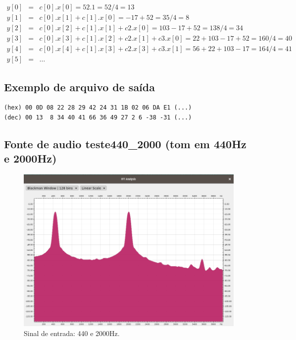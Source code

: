 \documentclass{article}
\begin{document}
\begin{eqnarray}
	y[0] &=& c[0] . x[0] = 52 . 1 = 52/4 = 13 \nonumber \\
	y[1] &=& c[0] . x[1] + c[1] . x[0] = -17 + 52 = 35 / 4 = 8 \nonumber \\
	y[2] &=& c[0] . x[2] + c[1] . x[1] + c2 . x[0] = 103 - 17 + 52 = 138/4 = 34 \nonumber \\
	y[3] &=& c[0] . x[3] + c[1] . x[2] + c2 . x[1] + c3 . x[0] = 22 + 103 - 17 + 52 = 160/4 = 40 \nonumber \\
	y[4] &=& c[0] . x[4] + c[1] . x[3] + c2 . x[3] + c3 . x[1] = 56 + 22 + 103 - 17 = 164/4 = 41 \nonumber \\
	y[5] &=& \dots \nonumber
\end{eqnarray}

\subsection{Exemplo de arquivo de saída}

\begin{verbatim}
(hex) 00 0D 08 22 28 29 42 24 31 1B 02 06 DA E1 (...)
(dec) 00 13  8 34 40 41 66 36 49 27 2 6 -38 -31 (...)
\end{verbatim}

\subsection{Fonte de audio teste440\_2000 (tom em 440Hz e 2000Hz)}

\begin{figure}[!htb]
	\centering
	\includegraphics[scale=1]{teste440_2000.png}
	\caption{Sinal de entrada: 440 e 2000Hz.}
	\label{fig:fir1}
\end{figure}
\end{document}
